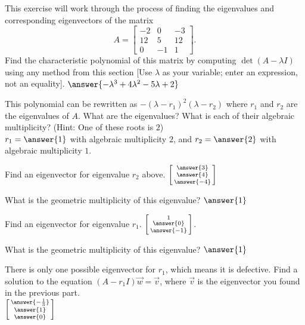 \documentclass{ximera}
\begin{document}
\begin{exercise}%
    This exercise will work through the process of finding the eigenvalues and corresponding eigenvectors of the matrix
    \begin{equation*}
    A = \begin{bmatrix}
        -2 & 0 & -3 \\ 
        12 & 5  & 12 \\ 
        0 &-1 & 1
    \end{bmatrix}.
    \end{equation*}
    Find the characteristic polynomial of this matrix by computing $\det(A - \lambda I)$ using any method from this section [Use $\lambda$ as your variable; enter an expression, not an equality]. $\answer{-\lambda^3 + 4\lambda^2  - 5\lambda + 2}$
    \begin{problem}
        This polynomial can be rewritten as $-(\lambda - r_1)^2(\lambda - r_2)$ where $r_1$ and $r_2$ are the eigenvalues of $A$. What are the eigenvalues? What is each of their algebraic multiplicity? (Hint: One of these roots is $2$)\\
        $r_1 = \answer{1}$ with algebraic multiplicity $2$, and $r_2 = \answer{2}$ with algebraic multiplicity $1$.
        \begin{problem}
            Find an eigenvector for eigenvalue $r_2$ above. $\left[\begin{smallmatrix} \answer{3} \\ \answer{4} \\ \answer{-4} \end{smallmatrix}\right]$ 
            \begin{problem}
                What is the geometric multiplicity of this eigenvalue? $\answer{1}$
            \end{problem}
        \end{problem}
        \begin{problem}
            Find an eigenvector for eigenvalue $r_1$. $\left[\begin{smallmatrix}1 \\ \answer{0} \\ \answer{-1} \end{smallmatrix}\right]$.
            \begin{problem}
                What is the geometric multiplicity of this eigenvalue? $\answer{1}$
            \end{problem}
        
            \begin{problem}
                There is only one possible eigenvector for $r_1$, which means it is defective. Find a solution to the equation $(A - r_1 I) \vec{w} = \vec{v}$, where $\vec{v}$ is the eigenvector you found in the previous part. \\
                $\left[\begin{smallmatrix} \answer{-\frac{1}{3}} \\ \answer{1} \\ \answer{0}\end{smallmatrix}\right]$
                

\end{problem}
\end{problem}
\end{problem}
\end{exercise}
\end{document}
